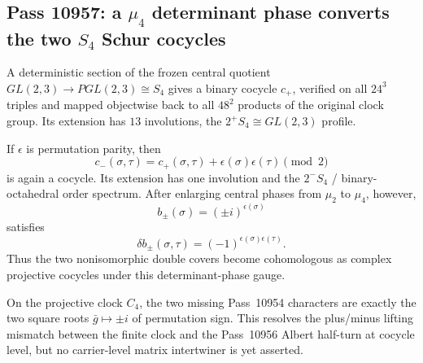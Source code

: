 \subsection{Pass 10957: a $\mu_4$ determinant phase converts the two $S_4$ Schur cocycles}

A deterministic section of the frozen central quotient
$GL(2,3)\to PGL(2,3)\cong S_4$ gives a binary cocycle $c_+$, verified on
all $24^3$ triples and mapped objectwise back to all $48^2$ products of the
original clock group.  Its extension has $13$ involutions, the
$2^+S_4\cong GL(2,3)$ profile.

If $\epsilon$ is permutation parity, then
\[
 c_-(\sigma,\tau)
 =c_+(\sigma,\tau)+\epsilon(\sigma)\epsilon(\tau)\pmod2
\]
is again a cocycle.  Its extension has one involution and the
$2^-S_4$ / binary-octahedral order spectrum.  After enlarging central phases
from $\mu_2$ to $\mu_4$, however,
\[
 b_\pm(\sigma)=(\pm i)^{\epsilon(\sigma)}
\]
satisfies
\[
 \delta b_\pm(\sigma,\tau)
 =(-1)^{\epsilon(\sigma)\epsilon(\tau)}.
\]
Thus the two nonisomorphic double covers become cohomologous as complex
projective cocycles under this determinant-phase gauge.

On the projective clock $C_4$, the two missing Pass~10954 characters are
exactly the two square roots $\bar g\mapsto\pm i$ of permutation sign.
This resolves the plus/minus lifting mismatch between the finite clock and
the Pass~10956 Albert half-turn at cocycle level, but no carrier-level matrix
intertwiner is yet asserted.

